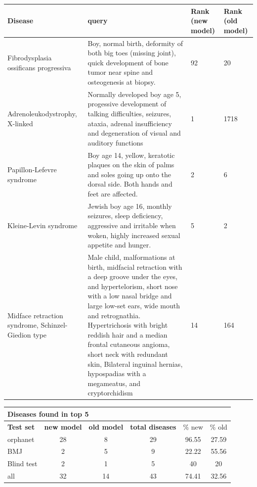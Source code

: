 \documentclass[10pt,letterpaper,final]{article}
\begin{document}
\begin{center}
\begin{small}
	\begin{tabular}{|p{3.5cm}|p{4.5cm}|p{1.8cm}|p{1.8cm}|}
	\hline
	\textbf{Disease}  & \textbf{query} & \textbf{Rank (new model)} & \textbf{Rank (old model)} \\
	\hline\hline
    Fibrodysplasia ossificans progressiva & Boy, normal birth, deformity of both big toes (missing joint), quick development of bone tumor near spine and osteogenesis at biopsy. & 92 & 20\\    \hline
    Adrenoleukodystrophy, X-linked & Normally developed boy age 5, progessive development of talking difficulties, seizures, ataxia, adrenal insufficiency and  degeneration of visual and auditory functions & 1 & 1718\\    \hline
    Papillon-Lefevre syndrome & Boy age 14, yellow, keratotic plaques on the skin of palms and soles going up onto the dorsal side. Both hands and feet are affected. & 2 & 6\\    \hline
    Kleine-Levin syndrome & Jewish boy age 16, monthly seizures, sleep deficiency, aggressive and irritable when woken, highly increased sexual appetite and hunger. & 5 & 2\\    \hline
    Midface retraction syndrome, Schinzel-Giedion type & Male child, malformations at birth, midfacial retraction with a deep groove under the eyes, and hypertelorism, short nose with a low nasal bridge and large low-set ears, wide mouth and retrognathia. Hypertrichosis with bright reddish hair and a median frontal cutaneous angioma, short neck with redundant skin, Bilateral inguinal hernias, hypospadias with a megameatus, and cryptorchidism  & 14 & 164\\    \hline
	\end{tabular}
\label{tab:results_blindtest_pre}
\end{small}
\end{center}

\begin{center}
\begin{small}
\begin{tabular}{l|cc||ccc}
	\multicolumn{6}{l}{\textbf{Diseases found in top 5}} \\ \hline
\textbf{Test set} & \textbf{new model} &	\textbf{old model}	 &	\textbf{total diseases} &	\% new	 &\% old \\ \hline
orphanet &	28 &	8	 &	29 &	96.55 &	27.59 \\
BMJ	& 2 &	5	 &	9	 & 22.22 &	55.56 \\
Blind test	& 2 &	1	 &	5 &	40	 &20 \\ \hline \hline
all	& 32 &	14	 &	43 &	74.41 &	32.56 \\ \hline
\end{tabular}
\end{small}
\end{center}
\end{document}
